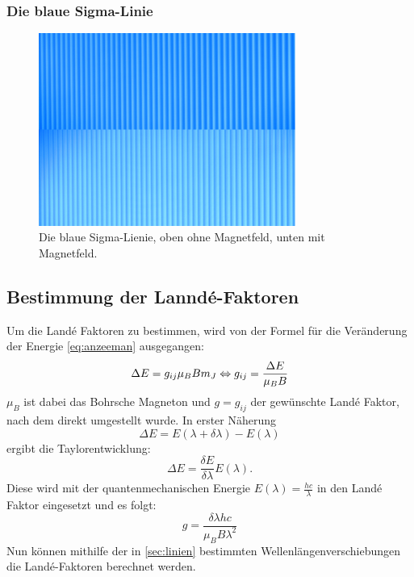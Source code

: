 \FloatBarrier
\newpage
\subsubsection{Die blaue Sigma-Linie}
\begin{figure}
  \centering
  \includegraphics[width=0.75\textwidth]{content/grafiken/blau 90.JPG}
  \caption{Die blaue Sigma-Lienie, oben ohne Magnetfeld, unten mit Magnetfeld.}
  \label{fig:blau0}
\end{figure}



\FloatBarrier
\newpage
\subsection{Bestimmung der Lanndé-Faktoren}
Um die Landé Faktoren zu bestimmen, wird von der Formel für die Veränderung der
Energie \autoref{eq:anzeeman} ausgegangen:
\begin{equation*}
  \Delta E = g_{ij} \mu_B B m_J\\
  \Leftrightarrow g_{ij}=\frac{\Delta E}{\mu_B B} 
\end{equation*}
$\mu_B$ ist dabei das Bohrsche Magneton und $g=g_{ij}$ der gewünschte Landé Faktor, nach
dem direkt umgestellt wurde. In erster Näherung
\begin{equation*}
  \Delta E=E(\lambda+\delta \lambda) - E(\lambda)
\end{equation*}
ergibt die Taylorentwicklung:
\begin{equation*}
  \Delta E=\frac{\delta E}{\delta \lambda} E(\lambda).
\end{equation*}
Diese wird mit der quantenmechanischen Energie $E(\lambda)=\frac{hc}{\lambda }$
in den Landé Faktor eingesetzt und es folgt:
\begin{equation*}
  g=\frac{\delta \lambda hc}{\mu_B B \lambda^2}
\end{equation*}
Nun können mithilfe der in \autoref{sec:linien} bestimmten Wellenlängenverschiebungen die
Landé-Faktoren berechnet werden.


